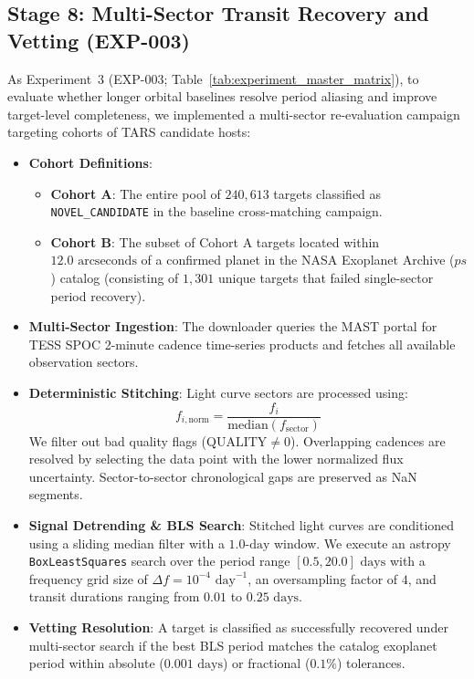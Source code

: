 \subsection{Stage 8: Multi-Sector Transit Recovery and Vetting (EXP-003)} \label{sec:method_exp3_multisector}
As Experiment~3 (EXP-003; Table~\ref{tab:experiment_master_matrix}), to evaluate whether longer orbital baselines resolve period aliasing and improve target-level completeness, we implemented a multi-sector re-evaluation campaign targeting cohorts of TARS candidate hosts:
\begin{itemize}
    \item \textbf{Cohort Definitions}:
        \begin{itemize}
            \item \textbf{Cohort A}: The entire pool of $240,613$ targets classified as \texttt{NOVEL\_CANDIDATE} in the baseline cross-matching campaign.
            \item \textbf{Cohort B}: The subset of Cohort A targets located within $12.0\text{ arcseconds}$ of a confirmed planet in the NASA Exoplanet Archive ($ps$) catalog (consisting of $1,301$ unique targets that failed single-sector period recovery).
        \end{itemize}
    \item \textbf{Multi-Sector Ingestion}: The downloader queries the MAST portal for TESS SPOC 2-minute cadence time-series products and fetches all available observation sectors.
    \item \textbf{Deterministic Stitching}: Light curve sectors are processed using:
        \begin{equation}
        f_{i, \text{norm}} = \frac{f_i}{\text{median}(f_{\text{sector}})}
        \end{equation}
        We filter out bad quality flags ($\text{QUALITY} \neq 0$). Overlapping cadences are resolved by selecting the data point with the lower normalized flux uncertainty. Sector-to-sector chronological gaps are preserved as NaN segments.
    \item \textbf{Signal Detrending \& BLS Search}: Stitched light curves are conditioned using a sliding median filter with a $1.0\text{-day}$ window. We execute an astropy \texttt{BoxLeastSquares} search over the period range $[0.5, 20.0]\text{ days}$ with a frequency grid size of $\Delta f = 10^{-4}\text{ day}^{-1}$, an oversampling factor of $4$, and transit durations ranging from $0.01$ to $0.25\text{ days}$.
    \item \textbf{Vetting Resolution}: A target is classified as successfully recovered under multi-sector search if the best BLS period matches the catalog exoplanet period within absolute ($0.001\text{ days}$) or fractional ($0.1\%$) tolerances.
\end{itemize}

